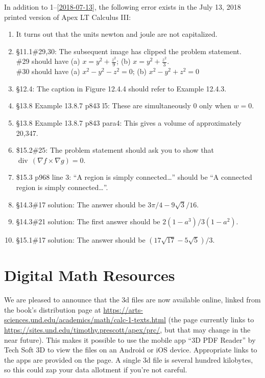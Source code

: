 \documentclass{amsart}
\makeatletter
\newcommand{\ds}{\displaystyle}
\DeclareMathOperator{\divv}{div}
\newcommand{\reforzero}[1]{%
 \@ifundefined{r@#1}{0}{\ref{#1}}%
}
\makeatother
\begin{document}
In addition to 1--\ref{2018-07-13}, the following error exists in the July 13, 2018 printed version of Apex LT Calculus III:
\begin{enumerate}\setcounter{enumi}{\reforzero{2018-07-13}}
\item It turns out that the units newton and joule are not capitalized.
\item \S11.1\#29,30: The subsequent image has clipped the problem statement.\\
 \#29 should have (a) $\ds x=y^2+\frac{z^2}{9}$; (b) $\ds x=y^2+\frac{z^2}{3}$.\\
 \#30 should have (a) $\ds x^2-y^2-z^2=0$; (b) $x^2-y^2+z^2=0$
\item \S12.4: The caption in Figure 12.4.4 should refer to Example 12.4.3.
\item \S13.8 Example 13.8.7 p843 l5: These are simultaneously 0 only when $w=0$.
\item \S13.8 Example 13.8.7 p843 para4: This gives a volume of approximately 20{,}347.
\item \$15.2\#25: The problem statement should ask you to show that $\divv\,(\nabla f\times\nabla g) = 0$.
\item \$15.3 p968 line 3: ``A region is simply connected\ldots'' should be ``A connected region is simply connected\ldots''.
\item \S14.3\#17 solution: The answer should be $3\pi/4-9\sqrt3/16$.
\item \S14.3\#21 solution: The first answer should be $2(1-a^3)/3(1-a^2)$.
\item \S15.1\#17 solution: The answer should be $(17\sqrt{17} - 5\sqrt{5})/3$.
\label{2018-07-13IIIplus}
\end{enumerate}

\section*{Digital Math Resources}

We are pleased to announce that the 3d files are now available online, linked from the book's distribution page at \url{https://arts-sciences.und.edu/academics/math/calc-1-texts.html} (the page currently links to \url{https://sites.und.edu/timothy.prescott/apex/prc/}, but that may change in the near future).  This makes it possible to use the mobile app ``3D PDF Reader'' by Tech Soft 3D to view the files on an Android or iOS device.  Appropriate links to the apps are provided on the page.  A single 3d file is several hundred kilobytes, so this could zap your data allotment if you're not careful.
\end{document}

